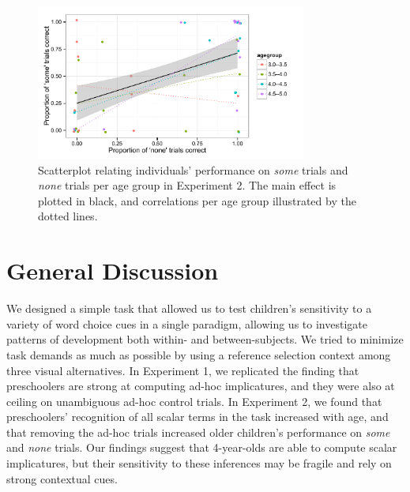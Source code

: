 \documentclass[10pt,letterpaper]{article}
\begin{document}
\begin{figure}[h] 
  \begin{center} 
    \includegraphics[width=3.5in]{figures/implicatures_scalarOnly_scatterplot.pdf} 
    \caption{\label{fig:expt2scatterplot} Scatterplot relating individuals' performance on \emph{some} trials and \emph{none} trials per age group in Experiment 2. The main effect is plotted in black, and correlations per age group illustrated by the dotted lines.  }
    \end{center} 
\vspace{-1ex} 
\end{figure}


 \section{General Discussion} 
 
We designed a simple task that allowed us to test children's sensitivity to a variety of word choice cues in a single paradigm, allowing us to investigate patterns of development both within- and between-subjects. We tried to minimize task demands as much as possible by using a reference selection context among three visual alternatives. In Experiment 1, we replicated the finding that preschoolers are strong at computing ad-hoc implicatures, and they were also at ceiling on unambiguous ad-hoc control trials. In Experiment 2, we found that preschoolers' recognition of all scalar terms in the task increased with age, and that removing the ad-hoc trials increased older children's performance on \emph{some} and \emph{none} trials. Our findings suggest that 4-year-olds are able to compute scalar implicatures, but their sensitivity to these inferences may be fragile and rely on strong contextual cues. 
\end{document}
